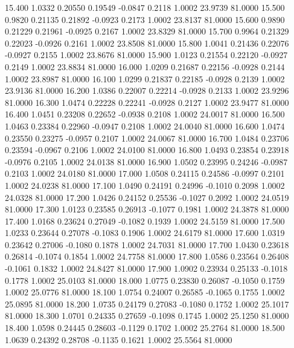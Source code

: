   15.400   1.0332   0.20550   0.19549  -0.0847   0.2118   1.0002  23.9739  81.0000
  15.500   0.9820   0.21135   0.21892  -0.0923   0.2173   1.0002  23.8137  81.0000
  15.600   0.9890   0.21229   0.21961  -0.0925   0.2167   1.0002  23.8329  81.0000
  15.700   0.9964   0.21329   0.22023  -0.0926   0.2161   1.0002  23.8508  81.0000
  15.800   1.0041   0.21436   0.22076  -0.0927   0.2155   1.0002  23.8676  81.0000
  15.900   1.0123   0.21554   0.22120  -0.0927   0.2149   1.0002  23.8834  81.0000
  16.000   1.0209   0.21687   0.22156  -0.0928   0.2144   1.0002  23.8987  81.0000
  16.100   1.0299   0.21837   0.22185  -0.0928   0.2139   1.0002  23.9136  81.0000
  16.200   1.0386   0.22007   0.22214  -0.0928   0.2133   1.0002  23.9296  81.0000
  16.300   1.0474   0.22228   0.22241  -0.0928   0.2127   1.0002  23.9477  81.0000
  16.400   1.0451   0.23208   0.22652  -0.0938   0.2108   1.0002  24.0017  81.0000
  16.500   1.0463   0.23384   0.22960  -0.0947   0.2108   1.0002  24.0040  81.0000
  16.600   1.0474   0.23550   0.23275  -0.0957   0.2107   1.0002  24.0067  81.0000
  16.700   1.0484   0.23706   0.23594  -0.0967   0.2106   1.0002  24.0100  81.0000
  16.800   1.0493   0.23854   0.23918  -0.0976   0.2105   1.0002  24.0138  81.0000
  16.900   1.0502   0.23995   0.24246  -0.0987   0.2103   1.0002  24.0180  81.0000
  17.000   1.0508   0.24115   0.24586  -0.0997   0.2101   1.0002  24.0238  81.0000
  17.100   1.0490   0.24191   0.24996  -0.1010   0.2098   1.0002  24.0328  81.0000
  17.200   1.0426   0.24152   0.25536  -0.1027   0.2092   1.0002  24.0519  81.0000
  17.300   1.0123   0.23585   0.26913  -0.1077   0.1981   1.0002  24.3878  81.0000
  17.400   1.0168   0.23624   0.27049  -0.1082   0.1939   1.0002  24.5159  81.0000
  17.500   1.0233   0.23644   0.27078  -0.1083   0.1906   1.0002  24.6179  81.0000
  17.600   1.0319   0.23642   0.27006  -0.1080   0.1878   1.0002  24.7031  81.0000
  17.700   1.0430   0.23618   0.26814  -0.1074   0.1854   1.0002  24.7758  81.0000
  17.800   1.0586   0.23564   0.26408  -0.1061   0.1832   1.0002  24.8427  81.0000
  17.900   1.0902   0.23934   0.25133  -0.1018   0.1778   1.0002  25.0103  81.0000
  18.000   1.0775   0.23830   0.26087  -0.1050   0.1759   1.0002  25.0776  81.0000
  18.100   1.0754   0.24007   0.26585  -0.1065   0.1755   1.0002  25.0895  81.0000
  18.200   1.0735   0.24179   0.27083  -0.1080   0.1752   1.0002  25.1017  81.0000
  18.300   1.0701   0.24335   0.27659  -0.1098   0.1745   1.0002  25.1250  81.0000
  18.400   1.0598   0.24445   0.28603  -0.1129   0.1702   1.0002  25.2764  81.0000
  18.500   1.0639   0.24392   0.28708  -0.1135   0.1621   1.0002  25.5564  81.0000
